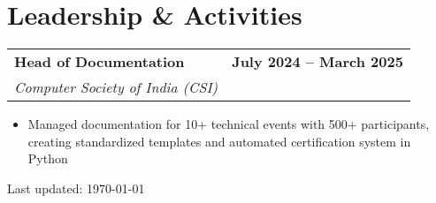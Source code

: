 \documentclass[11pt,a4paper]{article}
\makeatletter
\newcommand{\resumeItem}[1]{\item\small{#1}}
\newcommand{\resumeSubheading}[4]{
  \vspace{-1pt}
  \begin{tabular*}{\textwidth}[t]{l@{\extracolsep{\fill}}r}
    \textbf{#1} & \textcolor{light}{\small\textbf{#2}} \\
    \textit{\small#3} & \textcolor{light}{\small#4} \\
  \end{tabular*}\vspace{-5pt}
}
\makeatother
\begin{document}
\section{Leadership \& Activities}

\resumeSubheading
{Head of Documentation}{July 2024 -- March 2025}
{Computer Society of India (CSI)}{}
\begin{itemize}
    \resumeItem{Managed documentation for 10+ technical events with 500+ participants, creating standardized templates and automated certification system in Python}
    
\end{itemize}

\vfill
\begin{center}
    \textcolor{light}{\footnotesize Last updated: \today}
\end{center}
\end{document}
